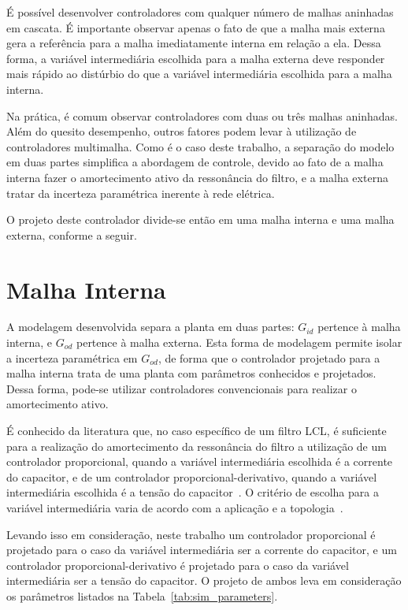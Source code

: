     É possível desenvolver controladores com qualquer número de malhas aninhadas em
    cascata. É importante observar apenas o fato de que a malha mais externa gera a
    referência para a malha imediatamente interna em relação a ela. Dessa forma, a
    variável intermediária escolhida para a malha externa deve responder mais rápido
    ao distúrbio do que a variável intermediária escolhida para a malha interna.

    Na prática, é comum observar controladores com duas ou três malhas aninhadas. Além
    do quesito desempenho, outros fatores podem levar à utilização de controladores
    multimalha. Como é o caso deste trabalho, a separação do modelo em duas partes
    simplifica a abordagem de controle, devido ao fato de a malha interna fazer o
    amortecimento ativo da ressonância do filtro, e a malha externa tratar da
    incerteza paramétrica inerente à rede elétrica.

    O projeto deste controlador divide-se então em uma malha interna e uma malha
    externa, conforme a seguir.

\section{Malha Interna}

    A modelagem desenvolvida separa a planta em duas partes: $G_{id}$ pertence à malha
    interna, e $G_{od}$ pertence à malha externa. Esta forma de modelagem permite isolar
    a incerteza paramétrica em $G_{od}$, de forma que o controlador projetado para a
    malha interna trata de uma planta com parâmetros conhecidos e projetados. Dessa forma,
    pode-se utilizar controladores convencionais para realizar o amortecimento ativo.

    É conhecido da literatura que, no caso específico de um filtro LCL, é suficiente
    para a realização do amortecimento da ressonância do filtro a utilização de um
    controlador proporcional, quando a variável intermediária escolhida é a corrente do
    capacitor, e de um controlador proporcional-derivativo, quando a variável intermediária
    escolhida é a tensão do capacitor~\cite{ref:DANNEHL}. O critério de escolha para a
    variável intermediária varia de acordo com a aplicação e a topologia~\cite{ref:POH}.

    Levando isso em consideração, neste trabalho um controlador proporcional é projetado
    para o caso da variável intermediária ser a corrente do capacitor, e um controlador
    proporcional-derivativo é projetado para o caso da variável intermediária ser a
    tensão do capacitor. O projeto de ambos leva em consideração os parâmetros listados
    na Tabela~\ref{tab:sim_parameters}.

